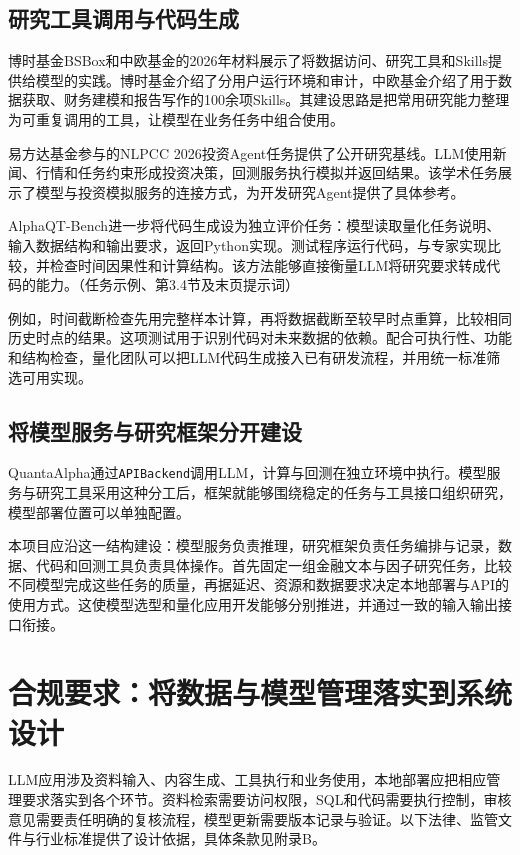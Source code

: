 \documentclass[11pt,a4paper,fontset=none]{ctexart}
\begin{document}
\subsection{研究工具调用与代码生成}
博时基金BSBox和中欧基金的2026年材料展示了将数据访问、研究工具和Skills提供给模型的实践。博时基金介绍了分用户运行环境和审计，中欧基金介绍了用于数据获取、财务建模和报告写作的100余项Skills。其建设思路是把常用研究能力整理为可重复调用的工具，让模型在业务任务中组合使用。

易方达基金参与的NLPCC 2026投资Agent任务提供了公开研究基线。LLM使用新闻、行情和任务约束形成投资决策，回测服务执行模拟并返回结果。该学术任务展示了模型与投资模拟服务的连接方式，为开发研究Agent提供了具体参考。

AlphaQT-Bench进一步将代码生成设为独立评价任务：模型读取量化任务说明、输入数据结构和输出要求，返回Python实现。测试程序运行代码，与专家实现比较，并检查时间因果性和计算结构。该方法能够直接衡量LLM将研究要求转成代码的能力。（任务示例、第3.4节及末页提示词）

例如，时间截断检查先用完整样本计算，再将数据截断至较早时点重算，比较相同历史时点的结果。这项测试用于识别代码对未来数据的依赖。配合可执行性、功能和结构检查，量化团队可以把LLM代码生成接入已有研发流程，并用统一标准筛选可用实现。

\subsection{将模型服务与研究框架分开建设}
QuantaAlpha通过\texttt{APIBackend}调用LLM，计算与回测在独立环境中执行。模型服务与研究工具采用这种分工后，框架就能够围绕稳定的任务与工具接口组织研究，模型部署位置可以单独配置。

本项目应沿这一结构建设：模型服务负责推理，研究框架负责任务编排与记录，数据、代码和回测工具负责具体操作。首先固定一组金融文本与因子研究任务，比较不同模型完成这些任务的质量，再据延迟、资源和数据要求决定本地部署与API的使用方式。这使模型选型和量化应用开发能够分别推进，并通过一致的输入输出接口衔接。

\section{合规要求：将数据与模型管理落实到系统设计}
LLM应用涉及资料输入、内容生成、工具执行和业务使用，本地部署应把相应管理要求落实到各个环节。资料检索需要访问权限，SQL和代码需要执行控制，审核意见需要责任明确的复核流程，模型更新需要版本记录与验证。以下法律、监管文件与行业标准提供了设计依据，具体条款见附录B。
\end{document}
